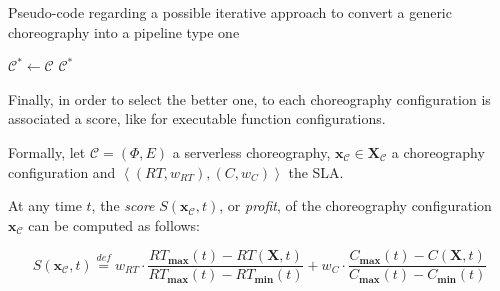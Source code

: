 \documentclass[12pt,a4paper]{report}
\newcommand{\mathDef}{\overset{\textit{def}}{=}}
\begin{document}
\begin{algorithm}\caption{Pseudo-code regarding a possible iterative approach to convert a generic choreography into a pipeline type one}\label{naiveIter}
	
	$\mathcal{C}^* \leftarrow \mathcal{C}$\;
	\Return $\mathcal{C}^*$
\end{algorithm}

Finally, in order to select the better one, to each choreography configuration is associated a score, like for executable function configurations.

Formally, let $\mathcal{C} = (\Phi,E)$ a serverless choreography, $\textbf{x}_{\mathcal{C}} \in \textbf{X}_{\mathcal{C}}$ a choreography configuration and $\left\langle (RT,w_{RT}),(C,w_{C}) \right\rangle$ the SLA.

At any time $t$, the \textit{score} $S(\textbf{x}_{\mathcal{C}},t)$, or \textit{profit}, of the choreography configuration $\textbf{x}_{\mathcal{C}}$ can be computed as follows:

\begin{equation}
	S(\textbf{x}_{\mathcal{C}},t) \mathDef w_{RT} \cdot \dfrac{RT_{\textbf{max}}(t) - RT(\textbf{X},t)}{RT_{\textbf{max}}(t) - RT_{\textbf{min}}(t)} + w_{C} \cdot \dfrac{C_{\textbf{max}}(t) - C(\textbf{X},t)}{C_{\textbf{max}}(t) - C_{\textbf{min}}(t)}
\end{equation}
\end{document}
